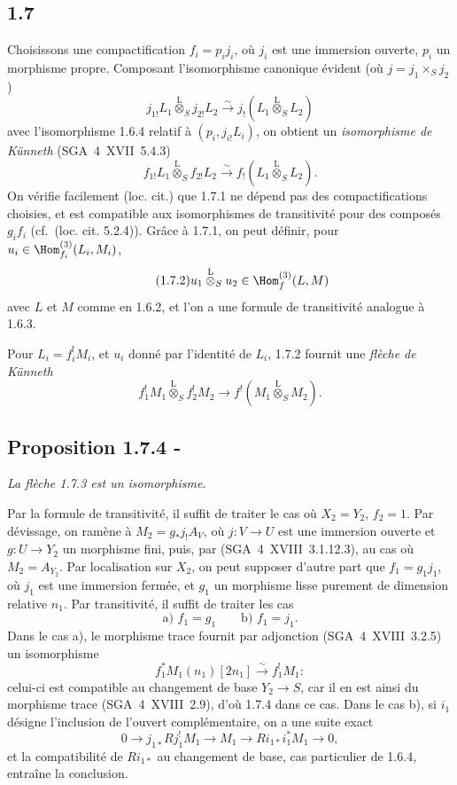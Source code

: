 \subsection*{1.7}
Choisissons une compactification $f_i=p_i j_i$, où $j_i$ est une immersion ouverte, $p_i$ un morphisme propre. Composant l'isomorphisme canonique évident (où $j=j_1\times_S j_2$)
\[
j_{1!}L_1\overset{\mathrm{L}}{\otimes}_{S}j_{2!}L_2\xrightarrow{\sim}j_{!}(L_1\overset{\mathrm{L}}{\otimes}_{S}L_2)
\]
avec l'isomorphisme 1.6.4 relatif à $(p_i,j_{i!}L_i)$, on obtient un \emph{isomorphisme de Künneth} (SGA~4~XVII~5.4.3)
\begin{equation}\tag{1.7.1}
f_{1!}L_1\overset{\mathrm{L}}{\otimes}_{S}f_{2!}L_2\xrightarrow{\sim}f_{!}(L_1\overset{\mathrm{L}}{\otimes}_{S}L_2).
\end{equation}
On vérifie facilement (loc. cit.) que 1.7.1 ne dépend pas des compactifications choisies, et est compatible aux isomorphismes de transitivité pour des composés $g_if_i$ (cf.~(loc. cit. 5.2.4)). Grâce à 1.7.1, on peut définir, pour $u_i\in\Hom_{f_i}^{(3)}(L_i,M_i)$,
\begin{equation}\tag{1.7.2}
u_1\overset{\mathrm{L}}{\otimes}_{S}u_2\in\Hom_f^{(3)}(L,M)
\end{equation}
avec $L$ et $M$ comme en 1.6.2, et l'on a une formule de transitivité analogue à 1.6.3.

Pour $L_i=f_i^{!}M_i$, et $u_i$ donné par l'identité de $L_i$, 1.7.2 fournit une \emph{flèche de Künneth}
\begin{equation}\tag{1.7.3}
f_1^{!}M_1\overset{\mathrm{L}}{\otimes}_{S}f_2^{!}M_2\longrightarrow f^{!}(M_1\overset{\mathrm{L}}{\otimes}_{S}M_2).
\end{equation}

\subsection*{Proposition 1.7.4 -}
\emph{La flèche 1.7.3 est un isomorphisme}.

Par la formule de transitivité, il suffit de traiter le cas où $X_2=Y_2$, $f_2=1$. Par dévissage, on ramène à $M_2=g_{*}j_{!}A_V$, où $j:V\to U$ est une immersion ouverte et $g:U\to Y_2$ un morphisme fini, puis, par (SGA~4~XVIII~3.1.12.3), au cas où $M_2=A_{Y_2}$. Par localisation sur $X_2$, on peut supposer d'autre part que $f_1=g_1j_1$, où $j_1$ est une immersion fermée, et $g_1$ un morphisme lisse purement de dimension relative $n_1$. Par transitivité, il suffit de traiter les cas
\[
\text{a) } f_1=g_1\qquad \text{b) } f_1=j_1.
\]
Dans le cas a), le morphisme trace fournit par adjonction (SGA~4~XVIII~3.2.5) un isomorphisme
\[
f_1^{*}M_1(n_1)[2n_1]\xrightarrow{\sim}f_1^{!}M_1 :
\]
celui-ci est compatible au changement de base $Y_2\to S$, car il en est ainsi du morphisme trace (SGA~4~XVIII~2.9), d'où 1.7.4 dans ce cas. Dans le cas b), si $i_1$ désigne l'inclusion de l'ouvert complémentaire, on a une suite exact
\[
0\longrightarrow j_{1*}Rj_1^{!}M_1\longrightarrow M_1\longrightarrow Ri_{1*}i_1^{*}M_1\longrightarrow0,
\]
et la compatibilité de $Ri_{1*}$ au changement de base, cas particulier de 1.6.4, entraîne la conclusion.

